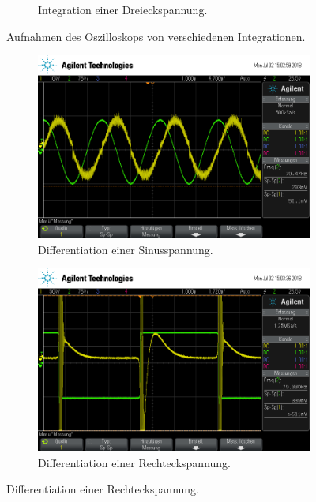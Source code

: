 \begin{figure}[ht]
\begin{subfigure}[]{\textwidth}
    \caption{Integration einer Dreieckspannung.}
    \label{subfig:int_dreieck}
  \end{subfigure}
  \caption{Aufnahmen des Oszilloskops von verschiedenen Integrationen.}
  \label{fig:integrationen}
\end{figure}


\begin{figure}[ht]
  \centering
  \begin{subfigure}[]{\textwidth}
    \centering
    \includegraphics[height=0.3\textheight]{data/scope_265.png}
    \caption{Differentiation einer Sinusspannung.}
    \label{subfig:dif_sinus}
  \end{subfigure}
  \begin{subfigure}[]{\textwidth}
    \centering
    \includegraphics[height=0.3\textheight]{data/scope_266.png}
    \caption{Differentiation einer Rechteckspannung.}
    \label{subfig:dif_rechteck}

\end{subfigure}
\end{figure}
